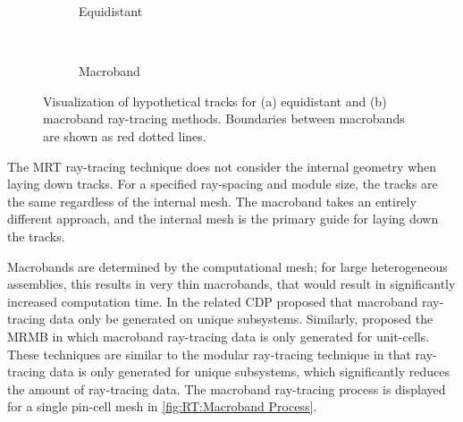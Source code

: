 {{{        \begin{figure}[h]
          \centering
          \begin{subfigure}[t]{0.45\linewidth}
            \centering
            \def\svgwidth{0.85\linewidth}
            
            \caption{Equidistant}
          \end{subfigure}%
          ~
          \begin{subfigure}[t]{0.45\linewidth}
              \centering
            \def\svgwidth{0.85\linewidth}
            
            \caption{Macroband}
          \end{subfigure}
          \caption{Visualization of hypothetical tracks for (a) equidistant and (b) macroband ray-tracing methods. Boundaries between macrobands are shown as red dotted lines.}
          \label{fig:RT:Equidisant vs Macroband}
        \end{figure}

        The \ac{MRT} ray-tracing technique does not consider the internal geometry when laying down tracks.
        For a specified ray-spacing and module size, the tracks are the same regardless of the internal mesh.
        The macroband takes an entirely different approach, and the internal mesh is the primary guide for laying down the tracks.

        Macrobands are determined by the computational mesh; for large heterogeneous assemblies, this results in very thin macrobands, that would result in significantly increased computation time.
        In the related \acf{CDP} \citet{Hong1999} proposed that macroband ray-tracing data only be generated on unique subsystems.
        Similarly, \citet{Yamamoto2005} proposed the \ac{MRMB} in which macroband ray-tracing data is only generated for unit-cells.
        These techniques are similar to the modular ray-tracing technique in that ray-tracing data is only generated for unique subsystems, which significantly reduces the amount of ray-tracing data.
        The macroband ray-tracing process is displayed for a single pin-cell mesh in \cref{fig:RT:Macroband Process}.

}}}
